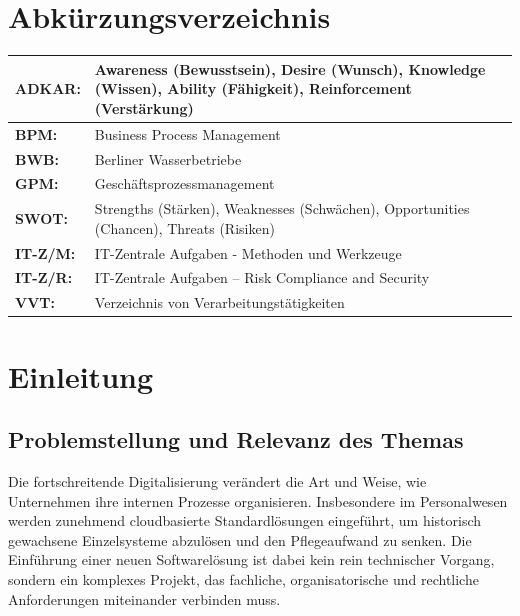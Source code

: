 \documentclass[
    12pt, 
    a4paper,
    ]{scrartcl} %
\begin{document}
\section*{Abkürzungsverzeichnis}  
\vspace{0.6cm}
\begin{tabular}{p{4cm} p{11.35cm}}   
    \textbf{\normalsize ADKAR:} & \normalsize Awareness (Bewusstsein), Desire (Wunsch), Knowledge (Wissen), Ability (Fähigkeit), Reinforcement (Verstärkung) \\[0.5cm]
    \hline
    \textbf{\normalsize BPM:} & \normalsize Business Process Management \\[0.5cm]
    \hline
    \textbf{\normalsize BWB:} & \normalsize Berliner Wasserbetriebe \\[0.5cm]
    \hline
    \textbf{\normalsize GPM:} & \normalsize Geschäftsprozessmanagement \\[0.5cm]
    \hline 
    \textbf{\normalsize SWOT:} & \normalsize Strengths (Stärken), Weaknesses (Schwächen), Opportunities (Chancen), Threats (Risiken) \\[0.5cm]
    \hline 
    \textbf{\normalsize IT-Z/M:} & \normalsize IT-Zentrale Aufgaben - Methoden und Werkzeuge \\[0.5cm]
    \hline
    \textbf{\normalsize IT-Z/R:} & \normalsize IT-Zentrale Aufgaben – Risk Compliance and Security \\[0.5cm]
    \hline
    \textbf{\normalsize VVT:} & \normalsize Verzeichnis von Verarbeitungstätigkeiten \\[0.5cm]
 \end{tabular}

\newpage
{} %
\setcounter{page}{1}


\section{Einleitung}

\subsection{Problemstellung und Relevanz des Themas}
Die fortschreitende Digitalisierung verändert die Art und Weise, wie Unternehmen ihre internen Prozesse organisieren. Insbesondere im Personalwesen werden zunehmend cloudbasierte Standardlösungen eingeführt, um historisch gewachsene Einzelsysteme abzulösen und den Pflegeaufwand zu senken. Die Einführung einer neuen Softwarelösung ist dabei kein rein technischer Vorgang, sondern ein komplexes Projekt, das fachliche, organisatorische und rechtliche Anforderungen miteinander verbinden muss.
\end{document}
